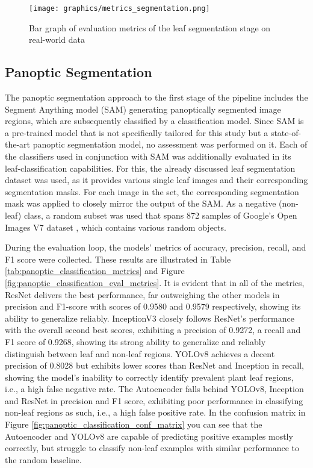 \documentclass[draft,final]{vutinfth} %
\begin{document}
\begin{figure}
    \centering
    \texttt{[image: graphics/metrics\_segmentation.png]}
    \caption{Bar graph of evaluation metrics of the leaf segmentation stage on real-world data}
    \label{fig:metrics_segmentation}
\end{figure}

\subsection{Panoptic Segmentation} \label{sec:results_segmentation_panoptic}
The panoptic segmentation approach to the first stage of the pipeline includes the Segment Anything model (SAM) \cite{kirillov_segment_2023} generating panoptically segmented image regions, which are subsequently classified by a classification model. 
Since SAM is a pre-trained model that is not specifically tailored for this study but a state-of-the-art panoptic segmentation model, no assessment was performed on it.
Each of the classifiers used in conjunction with SAM was additionally evaluated in its leaf-classification capabilities. For this, the already discussed leaf segmentation dataset \cite{giovi_leaf_2024} was used, as it provides various single leaf images and their corresponding segmentation masks. For each image in the set, the corresponding segmentation mask was applied to closely mirror the output of the SAM. As a negative (non-leaf) class, a random subset was used that spans 872 samples of Google's Open Images V7 dataset \cite{kuznetsova_open_2020}, which contains various random objects. 

During the evaluation loop, the models' metrics of accuracy, precision, recall, and F1 score were collected. These results are illustrated in Table \ref{tab:panoptic_classification_metrics} and Figure \ref{fig:panoptic_classification_eval_metrics}. It is evident that in all of the metrics, ResNet delivers the best performance, far outweighing the other models in precision and F1-score with scores of 0.9580 and 0.9579 respectively, showing its ability to generalize reliably.
InceptionV3 closely follows ResNet's performance with the overall second best scores, exhibiting a precision of 0.9272, a recall and F1 score of 0.9268, showing its strong ability to generalize and reliably distinguish between leaf and non-leaf regions.
YOLOv8 achieves a decent precision of 0.8028 but exhibits lower scores than ResNet and Inception in recall, showing the model's inability to correctly identify prevalent plant leaf regions, i.e., a high false negative rate. The Autoencoder falls behind YOLOv8, Inception and ResNet in precision and F1 score, exhibiting poor performance in classifying non-leaf regions as such, i.e., a high false positive rate. In the confusion matrix in Figure \ref{fig:panoptic_classification_conf_matrix} you can see that the Autoencoder and YOLOv8 are capable of predicting positive examples mostly correctly, but struggle to classify non-leaf examples with similar performance to the random baseline.
\end{document}

